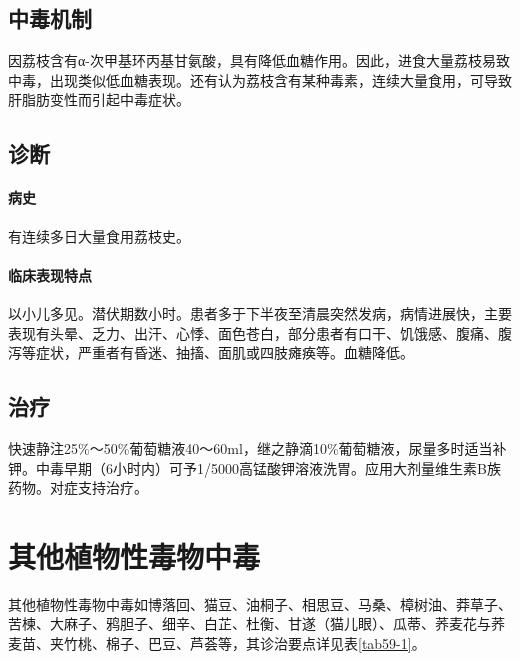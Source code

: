 \subsection{中毒机制}

因荔枝含有α-次甲基环丙基甘氨酸，具有降低血糖作用。因此，进食大量荔枝易致中毒，出现类似低血糖表现。还有认为荔枝含有某种毒素，连续大量食用，可导致肝脂肪变性而引起中毒症状。

\subsection{诊断}

\paragraph{病史}

有连续多日大量食用荔枝史。

\paragraph{临床表现特点}

以小儿多见。潜伏期数小时。患者多于下半夜至清晨突然发病，病情进展快，主要表现有头晕、乏力、出汗、心悸、面色苍白，部分患者有口干、饥饿感、腹痛、腹泻等症状，严重者有昏迷、抽搐、面肌或四肢瘫痪等。血糖降低。

\subsection{治疗}

快速静注25\%～50\%葡萄糖液40～60ml，继之静滴10\%葡萄糖液，尿量多时适当补钾。中毒早期（6小时内）可予1/5000高锰酸钾溶液洗胃。应用大剂量维生素B族药物。对症支持治疗。

\protect\hypertarget{text00170.html}{}{}

\section{其他植物性毒物中毒}

其他植物性毒物中毒如博落回、猫豆、油桐子、相思豆、马桑、樟树油、莽草子、苦楝、大麻子、鸦胆子、细辛、白芷、杜衡、甘遂（猫儿眼）、瓜蒂、荞麦花与荞麦苗、夹竹桃、棉子、巴豆、芦荟等，其诊治要点详见表\ref{tab59-1}。

